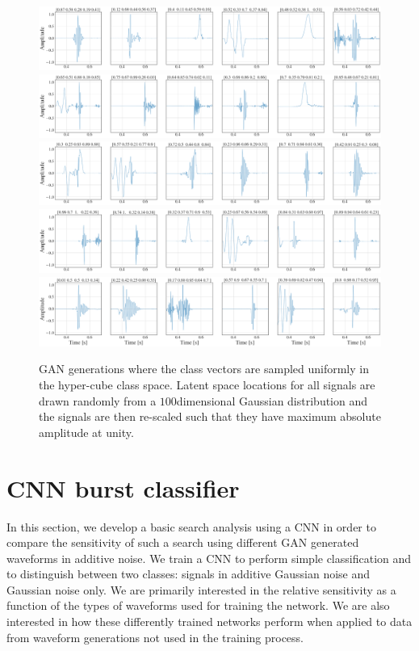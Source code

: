 \documentclass[12pt]{iopart}
\newcommand{\ndimensional}[1]{$#1$\nobreakdash\discretionary{-}{-}{-}dimensional}
\begin{document}
\begin{figure}
    \centering
    \includegraphics[width=\textwidth]{figures/generations/uniform_sample1.png}
    \includegraphics[width=\textwidth]{figures/generations/uniform_sample2.png}
    \includegraphics[width=\textwidth]{figures/generations/uniform_sample3.png}
    \includegraphics[width=\textwidth]{figures/generations/uniform_sample4.png}
    \includegraphics[width=\textwidth]{figures/generations/uniform_sample5.png}
    \caption{GAN generations where the class vectors are sampled uniformly in the hyper-cube class space. Latent space locations for all signals are drawn randomly from a \ndimensional{100} Gaussian distribution and the signals are then re-scaled such that they have maximum absolute amplitude at unity.}
    \label{fig:uniform_samples}
\end{figure}

\section{CNN burst classifier} \label{cnn classifier}
In this section, we develop a basic search analysis using a \ac{CNN} in order to compare the sensitivity of such a search using different \ac{GAN} generated waveforms in additive noise. We train a \ac{CNN} to perform simple classification and to distinguish between two classes: signals in additive Gaussian noise and Gaussian noise only. We are primarily interested in the relative sensitivity as a function of the types of waveforms used for training the network. We are also interested in how these differently trained networks perform when applied to data from waveform generations not used in the training process.
\end{document}
